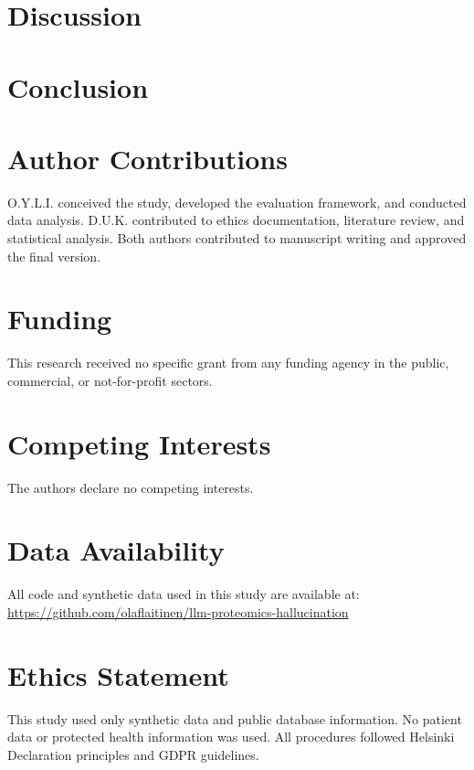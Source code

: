 \documentclass[12pt,a4paper]{article}
\begin{document}
\section*{Discussion}


\section*{Conclusion}


\section*{Author Contributions}
O.Y.L.I. conceived the study, developed the evaluation framework, and conducted data analysis. D.U.K. contributed to ethics documentation, literature review, and statistical analysis. Both authors contributed to manuscript writing and approved the final version.

\section*{Funding}
This research received no specific grant from any funding agency in the public, commercial, or not-for-profit sectors.

\section*{Competing Interests}
The authors declare no competing interests.

\section*{Data Availability}
All code and synthetic data used in this study are available at: \url{https://github.com/olaflaitinen/llm-proteomics-hallucination}

\section*{Ethics Statement}
This study used only synthetic data and public database information. No patient data or protected health information was used. All procedures followed Helsinki Declaration principles and GDPR guidelines.



\end{document}
